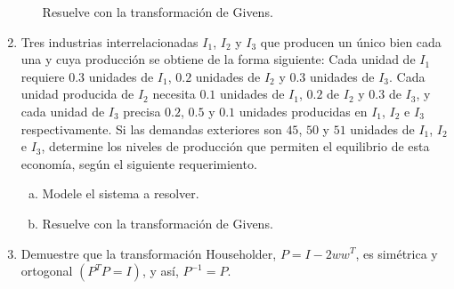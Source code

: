 \documentclass[
  spanish,
  8pt,
  utf8,
  xcolor=table,
  handout,
  aspectratio=169,
  professionalfonts,
  notheorems,
  mathserif,
]{beamer}
\newcounter{savedenum}
\newcommand*{\saveenum}{\setcounter{savedenum}{\theenumi}}
\begin{document}
\begin{frame}
\begin{enumerate}
\begin{multicols}{2}
\begin{enumerate}[a)]
				            Resuelve con la transformación de Givens.
			      \end{enumerate}
		      \end{multicols}

		\item

		      Tres industrias interrelacionadas $I_{1}$, $I_{2}$ y
		      $I_{3}$ que producen un único bien cada una y cuya
		      producción se obtiene de la forma siguiente:
		      Cada unidad de $I_{1}$ requiere $0.3$ unidades de $I_{1}$,
		      $0.2$ unidades de $I_{2}$ y $0.3$ unidades de $I_{3}$.
		      Cada unidad producida de $I_{2}$ necesita $0.1$ unidades de
		      $I_{1}$, $0.2$ de $I_{2}$ y $0.3$ de $I_{3}$, y cada unidad
		      de $I_{3}$ precisa $0.2$, $0.5$ y $0.1$ unidades producidas
		      en $I_{1}$, $I_{2}$ e $I_{3}$ respectivamente.
		      Si las demandas exteriores son $45$, $50$ y $51$ unidades
		      de $I_{1}$, $I_{2}$ e $I_{3}$, determine los niveles de
		      producción que permiten el equilibrio de esta economía,
		      según el siguiente requerimiento.

		      \begin{multicols}{2}
			      \begin{enumerate}[a)]
				      \item

				            Modele el sistema a resolver.

				      \item

				            Resuelve con la transformación de Givens.
			      \end{enumerate}
		      \end{multicols}

		\item

		      Demuestre que la transformación Householder, $P=I-2ww^{T}$,
		      es simétrica y ortogonal $\left(P^{T}P=I\right)$, y así,
		      $P^{-1}=P$.
	\end{enumerate}
	\saveenum
\end{frame}
\end{document}
